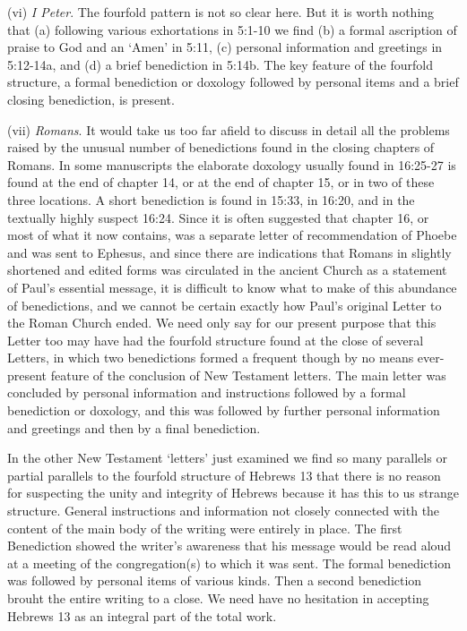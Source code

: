 (vi) {\it I Peter}.
The fourfold pattern is not so clear here.
But it is worth nothing that
(a) following various exhortations in 5:1-10 we find
(b) a formal ascription of praise to God and an `Amen' in 5:11,
(c) personal information and greetings in 5:12-14a, and
(d) a brief benediction in 5:14b.
The key feature of the fourfold structure, a formal benediction or doxology
followed by personal items and a brief closing benediction, is present.
\newline

(vii) {\it Romans}.
It would take us too far afield to discuss in detail all the problems raised by
the unusual number of benedictions found in the closing chapters of Romans.
In some manuscripts the elaborate doxology usually found in 16:25-27 is found at
the end of chapter 14, or at the end of chapter 15, or in two of these three
locations.
A short benediction is found in 15:33, in 16:20, and in the textually highly
suspect 16:24.
Since it is often suggested that chapter 16, or most of what it now contains,
was a separate letter of recommendation of Phoebe and was sent to Ephesus, and
since  there are indications that Romans in slightly shortened and edited forms
was circulated in the ancient Church as a statement of Paul's essential message,
it is difficult to know what to make of this abundance of benedictions, and we
cannot be certain exactly how Paul's original Letter to the Roman Church ended.
\newline
We need only say for our present purpose that this Letter too may have had the
fourfold structure found at the close of several Letters, in which two
benedictions formed a frequent though by no means ever-present feature of the
conclusion of New Testament letters.
The main letter was concluded by personal information and instructions followed
by a formal benediction or doxology, and this was followed by further personal
information and greetings and then by a final benediction.

In the other New Testament `letters' just examined we find so many parallels or
partial parallels to the fourfold structure of Hebrews 13 that there is no
reason for suspecting the unity and integrity of Hebrews because it has this to
us strange structure.
General instructions and information not closely connected with the content of
the main body of the writing were entirely in place.
The first Benediction showed the writer's awareness that his message would be
read aloud at a meeting of the congregation(s) to which it was sent.
The formal benediction was followed by personal items of various kinds.
Then a second benediction brouht the entire writing to a close.
We need have no hesitation in accepting Hebrews 13 as an integral part of the
total work.
